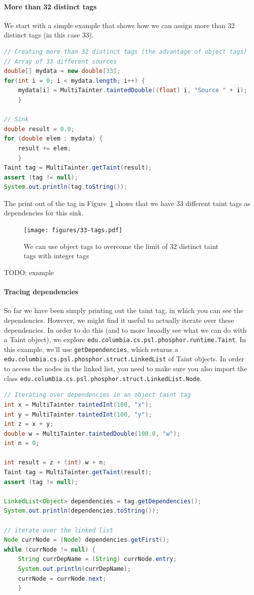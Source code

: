 \documentclass[a4paper]{article}
\newcommand{\todo}[1]{{\color{red}TODO: #1\\}}
\begin{document}
\paragraph{More than 32 distinct tags}
We start with a simple example that shows how we can assign more than 32 distinct tags (in this case 33).

\begin{lstlisting}[language=java]
// Creating more than 32 distinct tags (the advantage of object tags)
// Array of 33 different sources
double[] mydata = new double[33];
for(int i = 0; i < mydata.length; i++) {
    mydata[i] = MultiTainter.taintedDouble((float) i, "Source " + i);
    }
    
// Sink
double result = 0.0;
for (double elem : mydata) {
    result += elem;
    }
Taint tag = MultiTainter.getTaint(result);
assert (tag != null);
System.out.println(tag.toString());
\end{lstlisting}

The print out of the tag in Figure~\ref{fig:33-tags} shows that we have 33 different taint tags as dependencies for this sink.


\begin{figure}
\texttt{[image: figures/33-tags.pdf]}
\caption{We can use object tags to overcome the limit of 32 distinct taint tags with integer tags}
\label{fig:33-tags}
\end{figure}

\todo{example}
 
\paragraph{Tracing dependencies}
So far we have been simply printing out the taint tag, in which you can see the dependencies.
However, we might find it useful to actually iterate over these dependencies.
In order to do this (and to more broadly see what we can do with a Taint object),
we explore \verb|edu.columbia.cs.psl.phosphor.runtime.Taint|.
In this example, we'll use \verb|getDependencies|,
which returns a
\verb|edu.columbia.cs.psl.phosphor.struct.LinkedList|
of Taint objects.
In order to access the nodes in the linked list, you need to make sure you also import
the class \verb|edu.columbia.cs.psl.phosphor.struct.LinkedList.Node|.

\begin{lstlisting}[language=java]
// Iterating over dependencies in an object taint tag
int x = MultiTainter.taintedInt(100, "x");
int y = MultiTainter.taintedInt(100, "y");
int z = x + y;
double w = MultiTainter.taintedDouble(100.0, "w");
int n = 0;

int result = z + (int) w + n;
Taint tag = MultiTainter.getTaint(result);
assert (tag != null);

LinkedList<Object> dependencies = tag.getDependencies();
System.out.println(dependencies.toString());

// iterate over the linked list
Node currNode = (Node) dependencies.getFirst();
while (currNode != null) {
    String currDepName = (String) currNode.entry;
    System.out.println(currDepName);
    currNode = currNode.next;
    }
\end{lstlisting}
\end{document}
